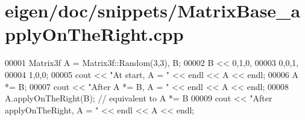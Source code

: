 \hypertarget{eigen_2doc_2snippets_2_matrix_base__apply_on_the_right_8cpp_source}{}\section{eigen/doc/snippets/\+Matrix\+Base\+\_\+apply\+On\+The\+Right.cpp}
\label{eigen_2doc_2snippets_2_matrix_base__apply_on_the_right_8cpp_source}

\begin{DoxyCode}
00001 Matrix3f A = Matrix3f::Random(3,3), B;
00002 B << 0,1,0,  
00003      0,0,1,  
00004      1,0,0;
00005 cout << \textcolor{stringliteral}{"At start, A = "} << endl << A << endl;
00006 A *= B;
00007 cout << \textcolor{stringliteral}{"After A *= B, A = "} << endl << A << endl;
00008 A.applyOnTheRight(B);  \textcolor{comment}{// equivalent to A *= B}
00009 cout << \textcolor{stringliteral}{"After applyOnTheRight, A = "} << endl << A << endl;
\end{DoxyCode}
